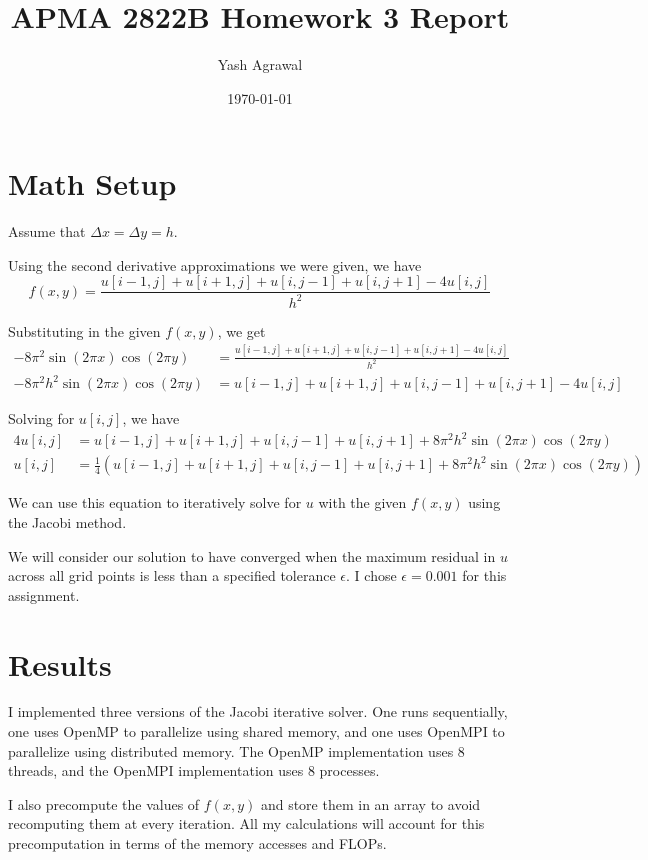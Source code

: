\documentclass[11pt]{article}
\title{APMA 2822B Homework 3 Report}
\author{Yash Agrawal}
\date{\today}
\begin{document}
\maketitle

\section*{Math Setup}
Assume that $\Delta x = \Delta y = h$. 

Using the second derivative approximations we were given, we have
\[
    f(x, y) = \frac{u[i-1, j] + u[i+1, j] + u[i, j-1] + u[i, j+1] - 4u[i, j]}{h^2}
\]

Substituting in the given $f(x, y)$, we get
\begin{align*}
    -8\pi^2 \sin(2\pi x) \cos(2\pi y) &= \frac{u[i-1, j] + u[i+1, j] + u[i, j-1] + u[i, j+1] - 4u[i, j]}{h^2} \\
    -8\pi^2 h^2 \sin(2\pi x) \cos(2\pi y) &= u[i-1, j] + u[i+1, j] + u[i, j-1] + u[i, j+1] - 4u[i, j]
\end{align*}

Solving for $u[i, j]$, we have
\begin{align*}
    4u[i, j] &= u[i-1, j] + u[i+1, j] + u[i, j-1] + u[i, j+1] + 8\pi^2 h^2 \sin(2\pi x) \cos(2\pi y) \\
    u[i, j] &= \frac{1}{4} \left( u[i-1, j] + u[i+1, j] + u[i, j-1] + u[i, j+1] + 8\pi^2 h^2 \sin(2\pi x) \cos(2\pi y) \right)
\end{align*}

We can use this equation to iteratively solve for $u$ with the given $f(x, y)$ using the Jacobi method. 

We will consider our solution to have converged when the maximum residual in $u$ across all grid points is less than a specified tolerance $\epsilon$. I chose $\epsilon = 0.001$ for this assignment.

\section*{Results}

I implemented three versions of the Jacobi iterative solver. One runs sequentially, one uses OpenMP to parallelize using shared memory, and one uses OpenMPI to parallelize using distributed memory. The OpenMP implementation uses 8 threads, and the OpenMPI implementation uses 8 processes. 

I also precompute the values of $f(x, y)$ and store them in an array to avoid recomputing them at every iteration. All my calculations will account for this precomputation in terms of the memory accesses and FLOPs.
\end{document}
